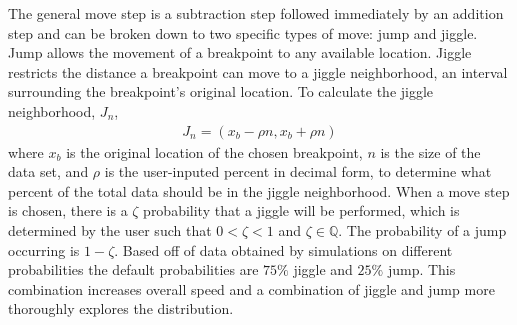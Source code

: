 \documentclass[submit]{smj}
\begin{document}
The general move step is a subtraction step followed immediately by an addition step and can be broken down to two specific types of move: jump and jiggle. Jump allows the movement of a breakpoint to any available location. Jiggle restricts the distance a breakpoint can move to a jiggle neighborhood, an interval surrounding the breakpoint's original location. To calculate the jiggle neighborhood, $J_n$, 
\begin{align*}
J_n = ( x_b-\rho n, x_b+\rho n )
\end{align*}
where $x_b$ is the original location of the chosen breakpoint, $n$ is the size of the data set, and $\rho$ is the user-inputed percent in decimal form, to determine what percent of the total data should be in the jiggle neighborhood. When a move step is chosen, there is a $\zeta$ probability that a jiggle will be performed, which is determined by the user such that $0<\zeta<1$ and $\zeta \in \mathbb{Q}$. The probability of a jump occurring is $1-\zeta$.  Based off of data obtained by simulations on different probabilities the default probabilities are $75\%$ jiggle and $25\%$ jump. This combination increases overall speed and a combination of jiggle and jump more thoroughly explores the distribution. 
\end{document}
